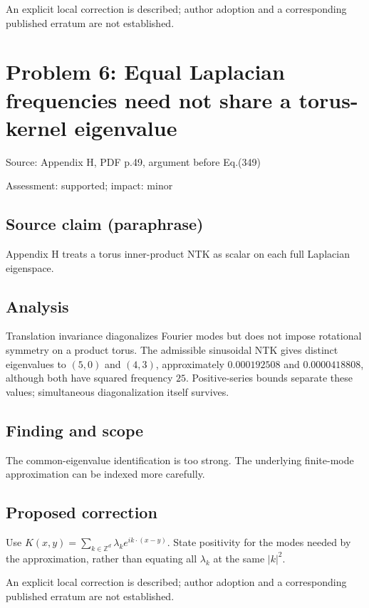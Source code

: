 \documentclass[11pt]{article}
\begin{document}
An explicit local correction is described; author adoption and a corresponding published erratum are not established.

\section*{Problem 6: Equal Laplacian frequencies need not share a torus-kernel eigenvalue}

Source: Appendix H, PDF p.49, argument before Eq.(349)

Assessment: supported; impact: minor

\subsection*{Source claim (paraphrase)}

Appendix H treats a torus inner-product NTK as scalar on each full Laplacian eigenspace.

\subsection*{Analysis}

Translation invariance diagonalizes Fourier modes but does not impose rotational symmetry on a product torus. The admissible sinusoidal NTK gives distinct eigenvalues to \((5,0)\) and \((4,3)\), approximately \(0.000192508\) and \(0.0000418808\), although both have squared frequency \(25\). Positive-series bounds separate these values; simultaneous diagonalization itself survives.

\subsection*{Finding and scope}

The common-eigenvalue identification is too strong. The underlying finite-mode approximation can be indexed more carefully.

\subsection*{Proposed correction}

Use \(K(x,y)=\sum_{k\in\mathbb Z^d}\lambda_ke^{ik\cdot(x-y)}\). State positivity for the modes needed by the approximation, rather than equating all \(\lambda_k\) at the same \(|k|^2\).

An explicit local correction is described; author adoption and a corresponding published erratum are not established.
\end{document}
